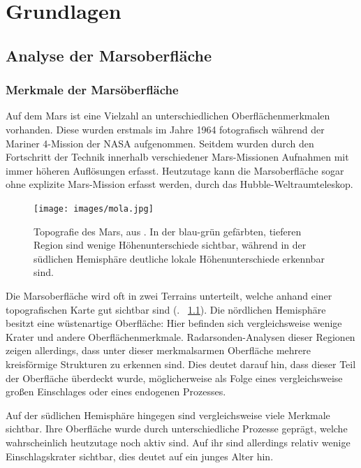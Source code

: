 \chapter{Grundlagen}
\label{chap:basics}

\section{Analyse der Marsoberfläche}
\label{sec:mars_analysis}

\subsection{Merkmale der Marsöberfläche}
\label{ssec:mars_surface_features}
Auf dem Mars ist eine Vielzahl an unterschiedlichen Oberflächenmerkmalen vorhanden. Diese wurden erstmals im Jahre 1964 fotografisch während der Mariner 4-Mission der NASA aufgenommen. \cite{mariner4} Seitdem wurden durch den Fortschritt der Technik innerhalb verschiedener Mars-Missionen Aufnahmen mit immer höheren Auflösungen erfasst. Heutzutage kann die Marsoberfläche sogar ohne explizite Mars-Mission erfasst werden, \zB durch das Hubble-Weltraumteleskop.

\begin{figure}[H]
	\centering
	\texttt{[image: images/mola.jpg]}
	\captionsetup{width=.9\textwidth}
	\caption{Topografie des Mars, aus \cite{mola}. In der blau-grün gefärbten, tieferen Region sind wenige Höhenunterschiede sichtbar, während in der südlichen Hemisphäre deutliche lokale Höhenunterschiede erkennbar sind.}
	\label{fig:mola}
\end{figure}

Die Marsoberfläche wird oft in zwei Terrains unterteilt, welche anhand einer topografischen Karte gut sichtbar sind (\vgl. \figurename~\ref{fig:mola}). Die nördlichen Hemisphäre besitzt eine wüstenartige Oberfläche: Hier befinden sich vergleichsweise wenige Krater und andere Oberflächenmerkmale. Radarsonden-Analysen dieser Regionen zeigen allerdings, dass unter dieser merkmalsarmen Oberfläche mehrere kreisförmige Strukturen zu erkennen sind. Dies deutet darauf hin, dass dieser Teil der Oberfläche überdeckt wurde, möglicherweise als Folge eines vergleichsweise großen Einschlages oder eines endogenen Prozesses. \cite[Kap.~7]{greeley_13}

Auf der südlichen Hemisphäre hingegen sind vergleichsweise viele Merkmale sichtbar. Ihre Oberfläche wurde durch unterschiedliche Prozesse geprägt, welche wahrscheinlich heutzutage noch aktiv sind. Auf ihr sind allerdings relativ wenige Einschlagskrater sichtbar, dies deutet auf ein junges Alter hin. \cite[Kap.~7]{greeley_13}

